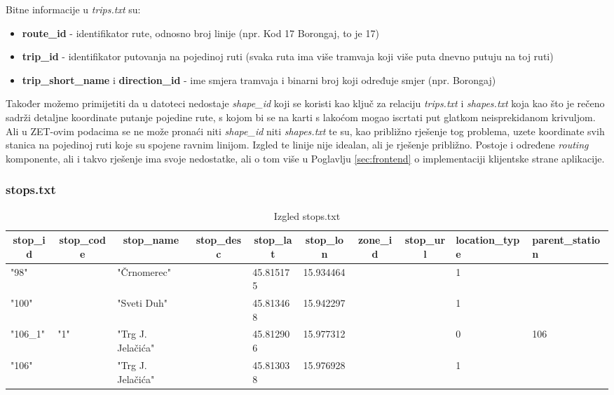 \documentclass[zavrsnirad]{fer}
\begin{document}
Bitne informacije u \textit{trips.txt} su:
\begin{itemize}
	\item \textbf{route\_id} - identifikator rute, odnosno broj linije (npr. Kod 17 Borongaj, to je 17)
	\item \textbf{trip\_id} - identifikator putovanja na pojedinoj ruti (svaka ruta ima više tramvaja koji više puta dnevno putuju na toj ruti)
	\item \textbf{trip\_short\_name} i \textbf{direction\_id} - ime smjera tramvaja i binarni broj koji određuje smjer (npr. Borongaj)
\end{itemize}

Također možemo primijetiti da u datoteci nedostaje \textit{shape\_id} koji se koristi kao ključ za relaciju \textit{trips.txt} i \textit{shapes.txt} koja kao što je rečeno sadrži detaljne koordinate putanje pojedine rute, s kojom bi se na karti s lakoćom mogao iscrtati put glatkom neisprekidanom krivuljom.
Ali u ZET-ovim podacima se ne može pronaći niti \textit{shape\_id} niti \textit{shapes.txt} te su, kao približno rješenje tog problema, uzete koordinate svih stanica na pojedinoj ruti koje su spojene ravnim linijom. Izgled te linije nije idealan, ali je rješenje približno. Postoje i određene \textit{routing} komponente, ali i takvo rješenje ima svoje nedostatke, ali o tom više u Poglavlju \ref{sec:frontend} o implementaciji klijentske strane aplikacije.
\newpage
\subsubsection{stops.txt}

\begin{table}[htb]
	\begin{adjustbox}{width=\columnwidth,center}
	\begin{tabular}{l|l|l|l|l|l|l|l|l|l}
		\hline
		\multicolumn{1}{c|}{\textbf{stop\_id}} & \multicolumn{1}{c|}{\textbf{stop\_code}} & \multicolumn{1}{c|}{\textbf{stop\_name}} & \multicolumn{1}{c|}{\textbf{stop\_desc}} & \multicolumn{1}{c|}{\textbf{stop\_lat}} & \multicolumn{1}{c|}{\textbf{stop\_lon}} & \multicolumn{1}{c|}{\textbf{zone\_id}} & \multicolumn{1}{c|}{\textbf{stop\_url}} & \textbf{location\_type} & \textbf{parent\_station} \\ \hline
		"98" &  & "Črnomerec" &  & 45.815175 & 15.934464 &  &  & 1 &  \\ \hline
		"100" &  & "Sveti Duh" &  & 45.813468 & 15.942297 &  &  & 1 &  \\ \hline
		"106\_1" & "1" & "Trg J. Jelačića" &  & 45.812906 & 15.977312 &  &  & 0 & 106 \\ \hline
		"106" &  & "Trg J. Jelačića" &  & 45.813038 & 15.976928 &  &  & 1 &  \\ \hline
	\end{tabular}
	\end{adjustbox}
	\caption{Izgled stops.txt}
	\label{tbl:stops}
\end{table}
\end{document}
